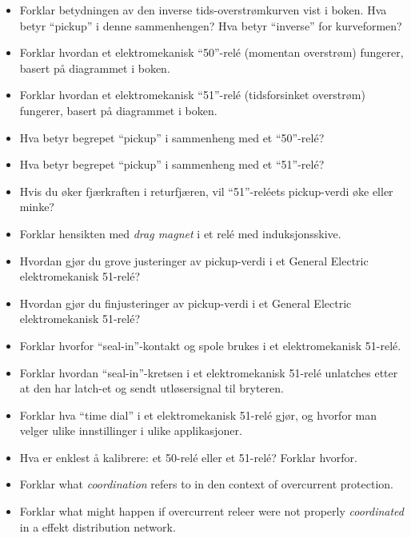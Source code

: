 \begin{itemize}
\item{} Forklar betydningen av den inverse tids-overstrømkurven vist i boken. Hva betyr ``pickup'' i denne sammenhengen? Hva betyr ``inverse'' for kurveformen?
\item{} Forklar hvordan et elektromekanisk ``50''-relé (momentan overstrøm) fungerer, basert på diagrammet i boken.
\item{} Forklar hvordan et elektromekanisk ``51''-relé (tidsforsinket overstrøm) fungerer, basert på diagrammet i boken.
\item{} Hva betyr begrepet ``pickup'' i sammenheng med et ``50''-relé?
\item{} Hva betyr begrepet ``pickup'' i sammenheng med et ``51''-relé?
\item{} Hvis du øker fjærkraften i returfjæren, vil ``51''-reléets pickup-verdi øke eller minke?
\item{} Forklar hensikten med {\it drag magnet} i et relé med induksjonsskive.
\item{} Hvordan gjør du grove justeringer av pickup-verdi i et General Electric elektromekanisk 51-relé?
\item{} Hvordan gjør du finjusteringer av pickup-verdi i et General Electric elektromekanisk 51-relé?
\item{} Forklar hvorfor ``seal-in''-kontakt og spole brukes i et elektromekanisk 51-relé.
\item{} Forklar hvordan ``seal-in''-kretsen i et elektromekanisk 51-relé unlatches etter at den har latch-et og sendt utløsersignal til bryteren.
\item{} Forklar hva ``time dial'' i et elektromekanisk 51-relé gjør, og hvorfor man velger ulike innstillinger i ulike applikasjoner.
\item{} Hva er enklest å kalibrere: et 50-relé eller et 51-relé? Forklar hvorfor.
\item{} Forklar what {\it coordination} refers to in den context of overcurrent protection.
\item{} Forklar what might happen if overcurrent releer were not properly {\it coordinated} in a effekt distribution network.
\end{itemize}














\vfil \eject

